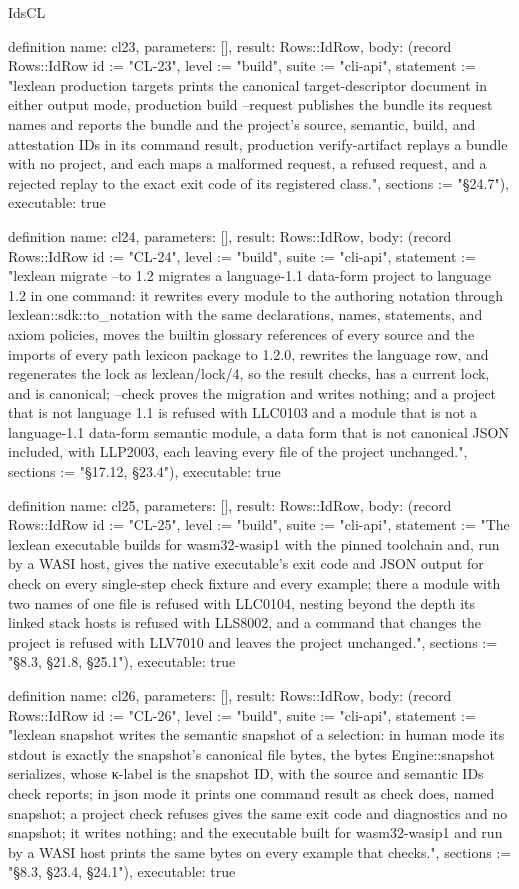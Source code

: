 \begin{lexlean}{IdsCL}
\begin{semanticmodule}
definition{
  name: cl23,
  parameters: [],
  result: Rows::IdRow,
  body: (record Rows::IdRow {id := "CL-23", level := "build", suite := "cli-api", statement := "lexlean production targets prints the canonical target-descriptor document in either output mode, production build --request publishes the bundle its request names and reports the bundle and the project's source, semantic, build, and attestation IDs in its command result, production verify-artifact replays a bundle with no project, and each maps a malformed request, a refused request, and a rejected replay to the exact exit code of its registered class.", sections := "§24.7"}),
  executable: true
}

definition{
  name: cl24,
  parameters: [],
  result: Rows::IdRow,
  body: (record Rows::IdRow {id := "CL-24", level := "build", suite := "cli-api", statement := "lexlean migrate --to 1.2 migrates a language-1.1 data-form project to language 1.2 in one command: it rewrites every module to the authoring notation through lexlean::sdk::to_notation with the same declarations, names, statements, and axiom policies, moves the builtin glossary references of every source and the imports of every path lexicon package to 1.2.0, rewrites the language row, and regenerates the lock as lexlean/lock/4, so the result checks, has a current lock, and is canonical; --check proves the migration and writes nothing; and a project that is not language 1.1 is refused with LLC0103 and a module that is not a language-1.1 data-form semantic module, a data form that is not canonical JSON included, with LLP2003, each leaving every file of the project unchanged.", sections := "§17.12, §23.4"}),
  executable: true
}

definition{
  name: cl25,
  parameters: [],
  result: Rows::IdRow,
  body: (record Rows::IdRow {id := "CL-25", level := "build", suite := "cli-api", statement := "The lexlean executable builds for wasm32-wasip1 with the pinned toolchain and, run by a WASI host, gives the native executable's exit code and JSON output for check on every single-step check fixture and every example; there a module with two names of one file is refused with LLC0104, nesting beyond the depth its linked stack hosts is refused with LLS8002, and a command that changes the project is refused with LLV7010 and leaves the project unchanged.", sections := "§8.3, §21.8, §25.1"}),
  executable: true
}

definition{
  name: cl26,
  parameters: [],
  result: Rows::IdRow,
  body: (record Rows::IdRow {id := "CL-26", level := "build", suite := "cli-api", statement := "lexlean snapshot writes the semantic snapshot of a selection: in human mode its stdout is exactly the snapshot's canonical file bytes, the bytes Engine::snapshot serializes, whose κ-label is the snapshot ID, with the source and semantic IDs check reports; in json mode it prints one command result as check does, named snapshot; a project check refuses gives the same exit code and diagnostics and no snapshot; it writes nothing; and the executable built for wasm32-wasip1 and run by a WASI host prints the same bytes on every example that checks.", sections := "§8.3, §23.4, §24.1"}),
  executable: true
}


\end{semanticmodule}
\end{lexlean}
